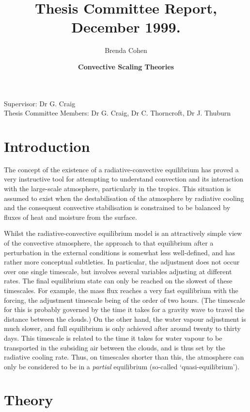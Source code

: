 \documentclass[11pt,a4paper]{article}
\title{\textbf{\Large{Thesis Committee Report, December 1999.}}}
\author{Brenda Cohen}
\date{\textbf{Convective Scaling Theories}}
\begin{document}
\maketitle

Supervisor: Dr G. Craig\\
Thesis Committee Members: Dr G. Craig, Dr C. Thorncroft, Dr J. Thuburn

\section{Introduction}
The concept of the existence of a radiative-convective equilibrium has
proved a very instructive tool for attempting to understand convection and
its interaction with the large-scale atmosphere, particularly in the
tropics. This situation is assumed to exist when the destabilisation
of the atmosphere by radiative cooling and the consequent convective
stabilisation is constrained to be balanced by fluxes of heat and
moisture from the surface.

Whilst the radiative-convective equilibrium model is an attractively
simple view of the convective atmosphere, the approach to that
equilibrium after a perturbation in the external conditions is
somewhat less well-defined, and has rather more conceptual
subtleties. In particular, the adjustment does not occur over one
single timescale, but involves several variables adjusting at
different rates. The final equilibrium state can only be reached on
the slowest of these timescales. For example, the mass flux reaches a
very fast equilibrium with the forcing, the adjustment timescale being
of the order of two hours. (The timescale for this is probably
governed by the time it takes for a gravity wave to travel the
distance between the clouds.) On the other hand, the water vapour
adjustment is much slower, and full equilibrium is only achieved after
around twenty to thirty days. This timescale is related to the time it
takes for water vapour to be transported in the subsiding air between
the clouds, and is thus set by the radiative cooling rate. Thus, on
timescales shorter than this, the atmosphere can only be considered
to be in a \textit{partial} equilibrium (so-called
`quasi-equilibrium').

\section{Theory}
\end{document}
